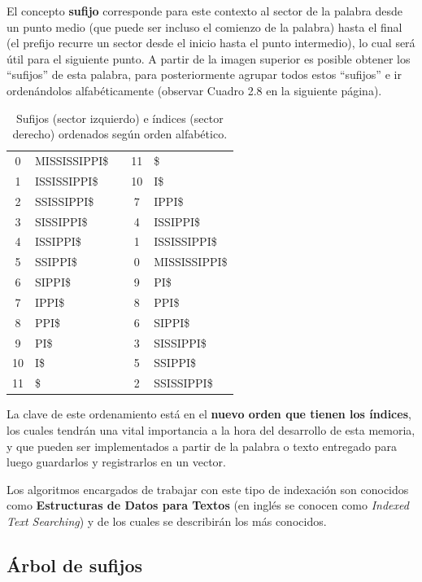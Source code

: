 El concepto \textbf{sufijo} corresponde para este contexto al sector de la palabra desde un punto medio (que puede ser incluso el comienzo de la palabra) hasta el final (el prefijo recurre un sector desde el inicio hasta el punto intermedio), lo cual será útil para el siguiente punto.
A partir de la imagen superior es posible obtener los ``sufijos'' de esta palabra, para posteriormente agrupar todos estos ``sufijos'' e ir ordenándolos alfabéticamente (observar Cuadro 2.8 en la siguiente página).

\begin{table}[h]
	\centering
	\label{my-label8}
	\begin{tabular}{c l c c l}
		0 & MISSISSIPPI\$ &  & 11 & \$\\
		1 & ISSISSIPPI\$ &  & 10 & I\$\\
		2 & SSISSIPPI\$ &  & 7 & IPPI\$\\
		3 & SISSIPPI\$ &  & 4 & ISSIPPI\$\\
		4 & ISSIPPI\$ &  & 1 & ISSISSIPPI\$\\
		5 & SSIPPI\$ &  & 0 & MISSISSIPPI\$\\
		6 & SIPPI\$ &  & 9 & PI\$\\
		7 & IPPI\$ &  & 8 & PPI\$\\
		8 & PPI\$ &  & 6 & SIPPI\$\\
		9 & PI\$ &  & 3 & SISSIPPI\$\\
		10 & I\$ &  & 5 & SSIPPI\$\\
		11 & \$ &  & 2 & SSISSIPPI\$\\
	\end{tabular}
\caption{Sufijos (sector izquierdo) e índices (sector derecho) ordenados según orden alfabético.}
\end{table}

La clave de este ordenamiento está en el \textbf{nuevo orden que tienen los índices}, los cuales tendrán una vital importancia a la hora del desarrollo de esta memoria, y que pueden ser implementados a partir de la palabra o texto entregado para luego guardarlos y registrarlos en un vector.

Los algoritmos encargados de trabajar con este tipo de indexación son conocidos como \textbf{Estructuras de Datos para Textos} (en inglés se conocen como \textit{Indexed Text Searching}) y de los cuales se describirán los más conocidos.

\subsection{Árbol de sufijos}

